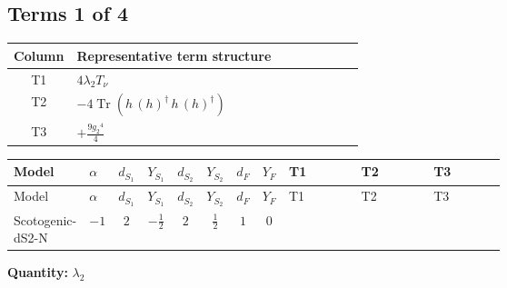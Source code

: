 \documentclass[8pt]{article}
\begin{document}
\begin{landscape}
\subsection*{Terms 1 of 4}
\begin{center}
\begin{tabular}{@{}c >{\raggedright\arraybackslash}p{0.82\linewidth}@{}}
\toprule
Column & Representative term structure \\
\midrule
T1 & \(\displaystyle 4 {\lambda_2} T_\nu\) \\
\midrule
T2 & \(\displaystyle -4 \operatorname{Tr}\!\left({h}\,\left({h}\right)^{\dagger}\,{h}\,\left({h}\right)^{\dagger}\right)\) \\
\midrule
T3 & \(\displaystyle +\frac{9 {g_2}^4}{4}\) \\
\midrule
\bottomrule
\end{tabular}
\end{center}
\smallskip
\tiny
\begin{longtable}{@{}llcccccc >{\raggedright\arraybackslash}p{0.21\linewidth} >{\raggedright\arraybackslash}p{0.21\linewidth} >{\raggedright\arraybackslash}p{0.21\linewidth}@{}}
\toprule
Model & $\alpha$ & $d_{S_1}$ & $Y_{S_1}$ & $d_{S_2}$ & $Y_{S_2}$ & $d_F$ & $Y_F$ & T1 & T2 & T3 \\
\midrule
\endfirsthead
\toprule
Model & $\alpha$ & $d_{S_1}$ & $Y_{S_1}$ & $d_{S_2}$ & $Y_{S_2}$ & $d_F$ & $Y_F$ & T1 & T2 & T3 \\
\midrule
\endhead
Scotogenic-dS2-N & $-1$ & $2$ & $-\frac{1}{2}$ & $2$ & $\frac{1}{2}$ & $1$ & $0$ & \scriptsize\adjustbox{max width=\linewidth}{$\begin{gathered} 4 {\lambda_2} T_\nu\end{gathered}$} & \scriptsize\adjustbox{max width=\linewidth}{$\begin{gathered} -4 \operatorname{Tr}\!\left({h}\,\left({h}\right)^{\dagger}\,{h}\,\left({h}\right)^{\dagger}\right)\end{gathered}$} & \scriptsize\adjustbox{max width=\linewidth}{$\begin{gathered} +\frac{9 {g_2}^4}{4}\end{gathered}$} \\
\midrule
\bottomrule
\end{longtable}
\clearpage
\noindent\textbf{Quantity: }$\lambda_2$\par\smallskip

\end{landscape}
\end{document}
